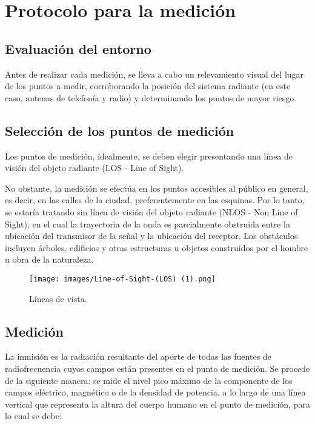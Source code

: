 \section{Protocolo para la medición}

\subsection{Evaluación del entorno}
Antes de realizar cada medición, se lleva a cabo un relevamiento visual del lugar de los puntos a medir, corroborando la posición del sistema radiante (en este caso, antenas de telefonía y radio) y determinando los puntos de mayor riesgo. 

\subsection{Selección de los puntos de medición}
Los puntos de medición, idealmente, se deben elegir presentando una línea de visión del objeto radiante (LOS - Line of Sight). 

No obstante, la medición se efectúa en los puntos accesibles al público en general, es decir, en las calles de la ciudad, preferentemente en las esquinas. Por lo tanto, se estaría tratando sin línea de visión del objeto radiante (NLOS - Non Line of Sight), en el cual la trayectoria de la onda es parcialmente obstruida entre la ubicación del transmisor de la señal y la ubicación del receptor. Los obstáculos incluyen árboles, edificios y otras estructuras u objetos construidos por el hombre u obra de la naturaleza.

\begin{figure}[H]
\centering
\texttt{[image: images/Line-of-Sight-(LOS) (1).png]}
\caption{Líneas de vista.}
\label{2.0}
\end{figure}

\subsection{Medición}
La inmisión es la radiación resultante del aporte de todas las fuentes de radiofrecuencia cuyos campos están presentes en el punto de medición. Se procede de la siguiente manera: se mide el nivel pico máximo de la componente de los campos eléctrico, magnético o de la densidad de potencia, a lo largo de una línea vertical que representa la altura del cuerpo humano en el punto de medición, para lo cual se debe:

